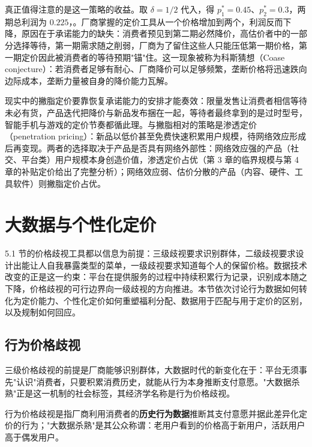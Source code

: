 真正值得注意的是这一策略的收益。取 $\delta = 1/2$ 代入，得 $p_1^* = 0.45$、$p_2^* = 0.3$，两期总利润为 $0.225$，。厂商掌握的定价工具从一个价格增加到两个，利润反而下降，原因在于承诺能力的缺失：消费者预见到第二期必然降价，高估价者中的一部分选择等待，第一期需求随之削弱，厂商为了留住这些人只能压低第一期价格，第一期定价因此被消费者的等待预期"锚"住。这一现象被称为科斯猜想（Coase conjecture）：若消费者足够有耐心、厂商降价可以足够频繁，垄断价格将迅速跌向边际成本，垄断力量被自身的降价能力瓦解。

现实中的撇脂定价要靠恢复承诺能力的安排才能奏效：限量发售让消费者相信等待未必有货，产品迭代把降价与新品发布捆在一起，等待者最终拿到的是过时型号，智能手机与游戏的定价节奏都循此理。与撇脂相对的策略是渗透定价（penetration pricing）：新品以低价甚至免费快速积累用户规模，待网络效应形成后再变现。两者的选择取决于产品是否具有网络外部性：网络效应强的产品（社交、平台类）用户规模本身创造价值，渗透定价占优（第 3 章的临界规模与第 4 章的补贴定价给出了完整分析）；网络效应弱、估价分散的产品（内容、硬件、工具软件）则撇脂定价占优。

\section{大数据与个性化定价}

5.1 节的价格歧视工具都以信息为前提：三级歧视要求识别群体，二级歧视要求设计出能让人自我暴露类型的菜单，一级歧视要求知道每个人的保留价格。数据技术改变的正是这一约束：平台在提供服务的过程中持续积累行为记录，识别成本随之下降，价格歧视的可行边界向一级歧视的方向推进。本节依次讨论行为数据如何转化为定价能力、个性化定价如何重塑福利分配、数据用于匹配与用于定价的区别，以及规制如何回应。

\subsection{行为价格歧视}

三级价格歧视的前提是厂商能够识别群体，大数据时代的新变化在于：平台无须事先"认识"消费者，只要积累消费历史，就能从行为本身推断支付意愿。"大数据杀熟"正是这一机制的社会标签，其经济学名称是行为价格歧视。

\begin{definition}
行为价格歧视是指厂商利用消费者的\textbf{历史行为数据}推断其支付意愿并据此差异化定价的行为；"大数据杀熟"是其公众称谓：老用户看到的价格高于新用户，活跃用户高于偶发用户。
\end{definition}

